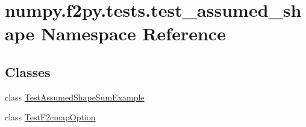 \hypertarget{namespacenumpy_1_1f2py_1_1tests_1_1test__assumed__shape}{}\section{numpy.\+f2py.\+tests.\+test\+\_\+assumed\+\_\+shape Namespace Reference}
\label{namespacenumpy_1_1f2py_1_1tests_1_1test__assumed__shape}
\subsection*{Classes}
\begin{DoxyCompactItemize}
\item 
class \hyperlink{classnumpy_1_1f2py_1_1tests_1_1test__assumed__shape_1_1TestAssumedShapeSumExample}{Test\+Assumed\+Shape\+Sum\+Example}
\item 
class \hyperlink{classnumpy_1_1f2py_1_1tests_1_1test__assumed__shape_1_1TestF2cmapOption}{Test\+F2cmap\+Option}
\end{DoxyCompactItemize}
